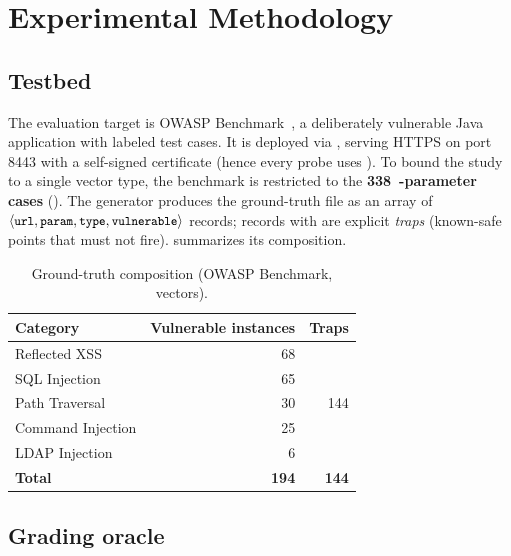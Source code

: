 
\section{Experimental Methodology}
\label{sec:metodologia}

\subsection{Testbed}
\label{sec:testbed}

The evaluation target is OWASP Benchmark~\cite{owaspbenchmark}, a
deliberately vulnerable Java application with labeled test cases. It is
deployed via , serving HTTPS on port \num{8443} with a
self-signed certificate (hence every probe uses ). To
bound the study to a single vector type, the benchmark is restricted to the
\textbf{\num{338}~-parameter cases} (). The
 generator produces the ground-truth file as an
array of
$\langle \texttt{\small url}, \texttt{\small param}, \texttt{\small type}, \texttt{\small vulnerable} \rangle$
records; records with  are explicit \emph{traps}
(known-safe points that must not fire).  summarizes its
composition.

\begin{table}[t]
  \centering
  \caption{Ground-truth composition (OWASP Benchmark, 
  vectors).}
  \label{tab:testbed}
  \begin{tabular}{lrr}
    \toprule
    Category & Vulnerable instances & Traps \\
    \midrule
    Reflected XSS            & 68 & \multirow{5}{*}{144} \\
    SQL Injection             & 65 & \\
    Path Traversal            & 30 & \\
    Command Injection         & 25 & \\
    LDAP Injection             & 6  & \\
    \midrule
    \textbf{Total}            & \textbf{194} & \textbf{144} \\
    \bottomrule
  \end{tabular}
\end{table}

\subsection{Grading oracle}
\label{sec:oraculo}

